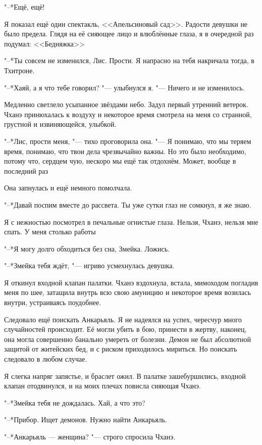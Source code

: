 \documentclass[a4paper,10pt,fleqn]{book}
\newcommand{\ldotst}{\so{...}\xspace}
\begin{document}
"--*Ещё, ещё!

Я показал ещё один спектакль, <<Апельсиновый сад>>.
Радости девушки не было предела.
Глядя на её сияющее лицо и влюблённые глаза, я в очередной раз подумал: <<Бедняжка\ldotst>>

"--*Ты совсем не изменился, Лис.
Прости.
Я напрасно на тебя накричала тогда, в Тхитроне.

"--*Хаяй, а я что тебе говорил? "--- улыбнулся я.
"--- Ничего и не изменилось.

Медленно светлело усыпанное звёздами небо.
Задул первый утренний ветерок.
Чханэ принюхалась к воздуху и некоторое время смотрела на меня со странной, грустной и извиняющейся, улыбкой.

"--*Лис, прости меня, "--- тихо проговорила она.
"--- Я понимаю, что мы теряем время, понимаю, что твои дела чрезвычайно важны.
Но это было необходимо, потому что, сердцем чую, нескоро мы ещё так отдохнём.
Может, вообще в последний раз\ldotst

Она запнулась и ещё немного помолчала.

"--*Давай поспим вместе до рассвета.
Ты уже сутки глаз не сомкнул, я же знаю.

Я с нежностью посмотрел в печальные огнистые глаза.
Нельзя, Чханэ, нельзя мне спать.
У меня столько работы\ldotst

"--*Я могу долго обходиться без сна, Змейка.
Ложись.

"--*Змейка тебя ждёт, "--- игриво усмехнулась девушка.

Я откинул входной клапан палатки.
Чханэ вздохнула, встала, мимоходом погладив меня по шее, затащила внутрь всю свою амуницию и некоторое время возилась внутри, устраиваясь поудобнее.

Следовало ещё поискать Анкарьяль.
Я не надеялся на успех, чересчур много случайностей происходит.
Её могли убить в бою, принести в жертву, наконец, она могла совершенно банально умереть от болезни.
Демон не был абсолютной защитой от житейских бед, и с риском приходилось мириться.
Но поискать следовало в любом случае.

Я слегка напряг запястье, и браслет ожил.
В палатке зашебуршились, входной клапан отодвинулся, и на моих плечах повисла сияющая Чханэ.

"--*Змейка тебя не дождалась.
Хай, а что это?

"--*Прибор.
Ищет демонов.
Нужно найти Анкарьяль.

"--*Анкарьяль — женщина? "--- строго спросила Чханэ.
\end{document}
